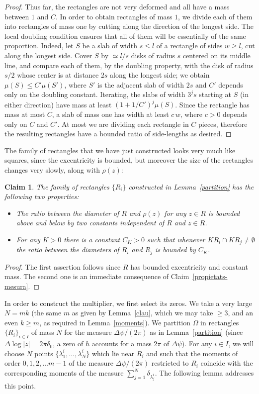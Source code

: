 \documentclass[12pt,twoside,final,psamsfonts]{amsart}
\theoremstyle{plain}
\newtheorem{claim}{Claim}
\theoremstyle{remark}
\theoremstyle{definition}
\begin{document}
\begin{proof}
Thus far, the rectangles are not very deformed and all have a mass between
$1$ and $C$. In order to obtain rectangles of mass $1$, we 
divide each of them into
rectangles of mass one by cutting along the direction of the longest side. 
The local
doubling condition ensures that all of them
will be essentially of the same proportion. Indeed, let $S$ be a slab of
width $s\le l$ of a rectangle of sides $w\ge l$, cut along the longest side.
Cover $S$ by $\simeq l/s$ disks of radius $s$ centered on its middle line, and
compare each of them, by the doubling property, with the disk of radius $s/2$
whose center is at distance $2s$ along the longest side; we obtain
$\mu(S)\le C'\mu(S')$, where $S'$ is the adjacent slab of width $2s$ and $C'$
depends only on the doubling constant. Iterating, the slabs of width $3^js$
starting at $S$ (in either direction) have mass at least $(1+1/C')^j\mu(S)$. Since
the rectangle has mass at most $C$, a slab of mass one has width at least
$c\,w$, where $c>0$ depends only on $C$ and $C'$.
At most we are dividing
each rectangle in $C$ pieces, therefore the resulting rectangles have 
a bounded ratio of
side-lengths as desired.
\end{proof}
The family of rectangles that we have just constructed looks very much like
squares, since the excentricity is bounded, but moreover the size of the
rectangles changes very slowly, along with $\rho(z)$:

\begin{claim}\label{propietats} The family of rectangles $\{R_i\}$ constructed
in Lemma~\ref{partition} has the following two properties:
\begin{itemize}
\item The ratio between the diameter of $R$ and $\rho(z)$ for any $z\in R$ is
bounded above and below by two constants independent of $R$ and $z\in R$.
\item For any $K>0$ there is a constant $C_K>0$  such that whenever $K R_i\cap
K R_j\neq \emptyset$ the ratio between the diameters of $R_i$ and $R_j$ is
bounded by $C_K$. 
\end{itemize} 
\end{claim}
\begin{proof}
The first assertion follows since $R$ has bounded excentricity and constant
mass. The second one is an immediate consequence of 
Claim~\ref{propietats-mesura}.
\end{proof}
In order to construct the multiplier, we first select  its zeros.
We take a very large $N=mk$ (the same $m$ as given by Lemma~\ref{clau}, which
we may take $\ge 3$, and
an even $k\ge m$, as required in Lemma~\ref{moments}).  We partition
$\Omega$ in rectangles $\{R_i\}_{i\in I}$ of mass $N$ for the measure
$\Delta\psi/(2\pi)$ as in
Lemma~\ref{partition} (since $\Delta\log|z|=2\pi\delta_0$, a zero of $h$
accounts for a mass $2\pi$ of $\Delta\psi$). For any $i\in I$, we will choose $N$ points
$\{\lambda^i_1,\ldots,\lambda^i_N\}$ which lie near $R_i$ and such that the
moments of order $0,1,2,\ldots m-1$  of the measure $\Delta\psi/(2\pi)$ restricted to
$R_i$ coincide with the corresponding moments of the measure $\sum_{j=1}^N
\delta_{\lambda^i_j}$. The following lemma addresses this point.
\end{document}
